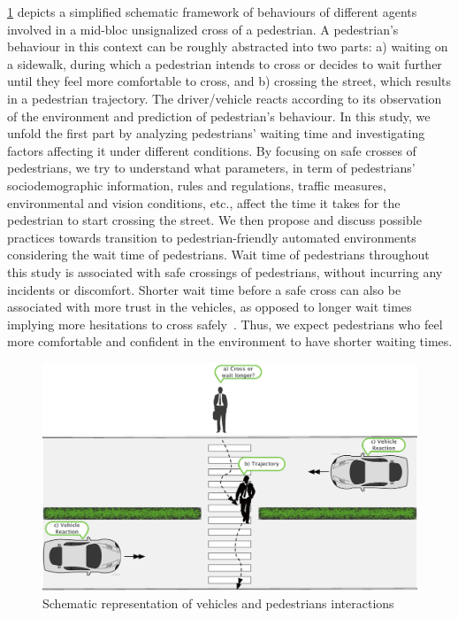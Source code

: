 \cref{fig:interaction} depicts a simplified schematic framework of behaviours of different agents involved in a mid-bloc unsignalized cross of a pedestrian. A pedestrian's behaviour in this context can be roughly abstracted into two parts: a) waiting on a sidewalk, during which a pedestrian intends to cross or decides to wait further until they feel more comfortable to cross, and b) crossing the street, which results in a pedestrian trajectory. The driver/vehicle reacts according to its observation of the environment and prediction of pedestrian's behaviour. In this study, we unfold the first part by analyzing pedestrians' waiting time and investigating factors affecting it under different conditions. By focusing on safe crosses of pedestrians, we try to understand what parameters, in term of pedestrians' sociodemographic information, rules and regulations, traffic measures, environmental and vision conditions, etc., affect the time it takes for the pedestrian to start crossing the street. We then propose and discuss possible practices towards transition to pedestrian-friendly automated environments considering the wait time of pedestrians. Wait time of pedestrians throughout this study is associated with safe crossings of pedestrians, without incurring any incidents or discomfort. Shorter wait time before a safe cross can also be associated with more trust in the vehicles, as opposed to longer wait times implying more hesitations to cross safely~\citep{jayaraman2019pedestrian}. Thus, we expect pedestrians who feel more comfortable and confident in the environment to have shorter waiting times.
\begin{figure}
    \centering
    \includegraphics[scale=0.7]{chapter_4/figures/cross.pdf}
    \caption{Schematic representation of vehicles and pedestrians interactions}
    \label{fig:interaction}
\end{figure}


